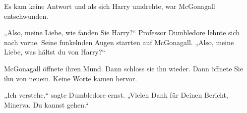 Es kam keine Antwort und als sich Harry umdrehte, war McGonagall entschwunden.


„Also, meine Liebe, wie fanden Sie Harry?“
Professor Dumbledore lehnte sich nach vorne. Seine funkelnden Augen starrten auf McGonagall. „Also, meine Liebe, was hältst du von Harry?“

McGonagall öffnete ihren Mund. Dann schloss sie ihn wieder. Dann öffnete Sie ihn von neuem. Keine Worte kamen hervor.

„Ich verstehe,“ sagte Dumbledore ernst. „Vielen Dank für Deinen Bericht, Minerva. Du kannst gehen.“

